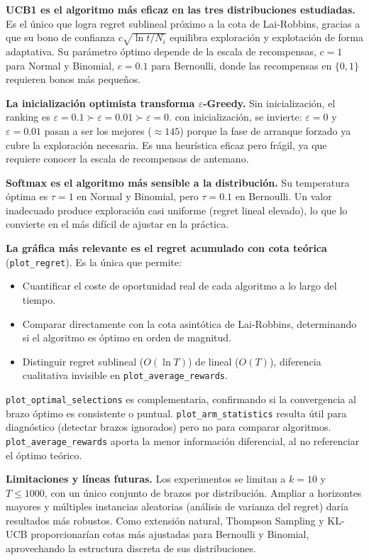 \textbf{UCB1 es el algoritmo más eficaz en las tres distribuciones estudiadas.} Es el único que logra regret sublineal próximo a la cota de Lai-Robbins, gracias a que su bono de confianza $c\sqrt{\ln t / N_i}$ equilibra exploración y explotación de forma adaptativa. Su parámetro óptimo depende de la escala de recompensas, $c{=}1$ para Normal y Binomial, $c{=}0{.}1$ para Bernoulli, donde las recompensas en $\{0,1\}$ requieren bonos más pequeños.

\textbf{La inicialización optimista transforma $\varepsilon$-Greedy.} Sin inicialización, el ranking es $\varepsilon{=}0{.}1 \succ \varepsilon{=}0{.}01 \succ \varepsilon{=}0$. con inicialización, se invierte: $\varepsilon{=}0$ y $\varepsilon{=}0{.}01$ pasan a ser los mejores (${\approx}145$) porque la fase de arranque forzado ya cubre la exploración necesaria. Es una heurística eficaz pero frágil, ya que requiere conocer la escala de recompensas de antemano.

\textbf{Softmax es el algoritmo más sensible a la distribución.} Su temperatura óptima es $\tau{=}1$ en Normal y Binomial, pero $\tau{=}0{.}1$ en Bernoulli. Un valor inadecuado produce exploración casi uniforme (regret lineal elevado), lo que lo convierte en el más difícil de ajustar en la práctica.

\textbf{La gráfica más relevante es el regret acumulado con cota teórica} (\texttt{plot\_regret}). Es la única que permite:
\begin{itemize}
    \item Cuantificar el coste de oportunidad real de cada algoritmo a lo largo del tiempo.
    \item Comparar directamente con la cota asintótica de Lai-Robbins, determinando si el algoritmo es óptimo en orden de magnitud.
    \item Distinguir regret sublineal ($O(\ln T)$) de lineal ($O(T)$), diferencia cualitativa invisible en \texttt{plot\_average\_rewards}.
\end{itemize}

\texttt{plot\_optimal\_selections} es complementaria, confirmando si la convergencia al brazo óptimo es consistente o puntual. \texttt{plot\_arm\_statistics} resulta útil para diagnóstico (detectar brazos ignorados) pero no para comparar algoritmos. \texttt{plot\_average\_rewards} aporta la menor información diferencial, al no referenciar el óptimo teórico.

\textbf{Limitaciones y líneas futuras.}
Los experimentos se limitan a $k{=}10$ y $T{\leq}1000$, con un único conjunto de brazos por distribución. Ampliar a horizontes mayores y múltiples instancias aleatorias (análisis de varianza del regret) daría resultados más robustos. Como extensión natural, Thompson Sampling y KL-UCB proporcionarían cotas más ajustadas para Bernoulli y Binomial, aprovechando la estructura discreta de sus distribuciones.

